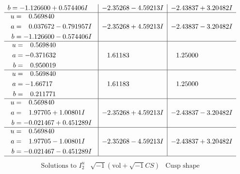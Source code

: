 \documentclass[1p]{elsarticle_modified}
\theoremstyle{definition}
\newcommand{\I}{\sqrt{-1}}
\begin{document}
$$\begin{array}{c|c|c}
\begin{aligned}
b &= -1.126600 + 0.574406 I\end{aligned}
 & -2.35268 - 4.59213 I & -2.43837 + 3.20482 I \\ \hline\begin{aligned}
u &= \phantom{-}0.569840\phantom{ +0.000000I} \\
a &= \phantom{-}0.037672 - 0.791957 I \\
b &= -1.126600 - 0.574406 I\end{aligned}
 & -2.35268 + 4.59213 I & -2.43837 - 3.20482 I \\ \hline\begin{aligned}
u &= \phantom{-}0.569840\phantom{ +0.000000I} \\
a &= -0.371632\phantom{ +0.000000I} \\
b &= \phantom{-}0.950019\phantom{ +0.000000I}\end{aligned}
 & \phantom{-}1.61183\phantom{ +0.000000I} & \phantom{-}1.25000\phantom{ +0.000000I} \\ \hline\begin{aligned}
u &= \phantom{-}0.569840\phantom{ +0.000000I} \\
a &= -1.66717\phantom{ +0.000000I} \\
b &= \phantom{-}0.211771\phantom{ +0.000000I}\end{aligned}
 & \phantom{-}1.61183\phantom{ +0.000000I} & \phantom{-}1.25000\phantom{ +0.000000I} \\ \hline\begin{aligned}
u &= \phantom{-}0.569840\phantom{ +0.000000I} \\
a &= \phantom{-}1.97705 + 1.00801 I \\
b &= -0.021467 + 0.451289 I\end{aligned}
 & -2.35268 + 4.59213 I & -2.43837 - 3.20482 I \\ \hline\begin{aligned}
u &= \phantom{-}0.569840\phantom{ +0.000000I} \\
a &= \phantom{-}1.97705 - 1.00801 I \\
b &= -0.021467 - 0.451289 I\end{aligned}
 & -2.35268 - 4.59213 I & -2.43837 + 3.20482 I\\
 \hline 
 \end{array}$$\newpage$$\begin{array}{c|c|c}  
\text{Solutions to }I^u_{2}& \I (\text{vol} + \sqrt{-1}CS) & \text{Cusp shape}\\
 \hline 
\begin{aligned}

\end{aligned}
\end{array}$$
\end{document}
